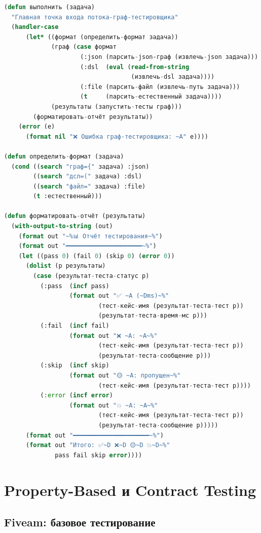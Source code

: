 \documentclass[12pt, a4paper, twoside]{article}
\begin{document}
\begin{lstlisting}[language=CommonLisp,caption={Функция выполнить для потока}]
(defun выполнить (задача)
  "Главная точка входа потока-граф-тестировщика"
  (handler-case
      (let* ((формат (определить-формат задача))
             (граф (case формат
                     (:json (парсить-json-граф (извлечь-json задача)))
                     (:dsl  (eval (read-from-string
                                   (извлечь-dsl задача))))
                     (:file (парсить-файл (извлечь-путь задача)))
                     (t     (парсить-естественный задача))))
             (результаты (запустить-тесты граф)))
        (форматировать-отчёт результаты))
    (error (e)
      (format nil "❌ Ошибка граф-тестировщика: ~A" e))))

(defun определить-формат (задача)
  (cond ((search "граф={" задача) :json)
        ((search "дсл=(" задача) :dsl)
        ((search "файл=" задача) :file)
        (t :естественный)))

(defun форматировать-отчёт (результаты)
  (with-output-to-string (out)
    (format out "~%📊 Отчёт тестирования~%")
    (format out "━━━━━━━━━━━━━━━━━━━━━~%")
    (let ((pass 0) (fail 0) (skip 0) (error 0))
      (dolist (р результаты)
        (case (результат-теста-статус р)
          (:pass  (incf pass)
                  (format out "✅ ~A (~Dms)~%"
                          (тест-кейс-имя (результат-теста-тест р))
                          (результат-теста-время-мс р)))
          (:fail  (incf fail)
                  (format out "❌ ~A: ~A~%"
                          (тест-кейс-имя (результат-теста-тест р))
                          (результат-теста-сообщение р)))
          (:skip  (incf skip)
                  (format out "🟡 ~A: пропущен~%"
                          (тест-кейс-имя (результат-теста-тест р))))
          (:error (incf error)
                  (format out "💥 ~A: ~A~%"
                          (тест-кейс-имя (результат-теста-тест р))
                          (результат-теста-сообщение р)))))
      (format out "━━━━━━━━━━━━━━━━━━━━━~%")
      (format out "Итого: ✅~D ❌~D 🟡~D 💥~D~%"
              pass fail skip error))))
\end{lstlisting}

\section{Property-Based и Contract Testing}

\subsection{Fiveam: базовое тестирование}
\end{document}
